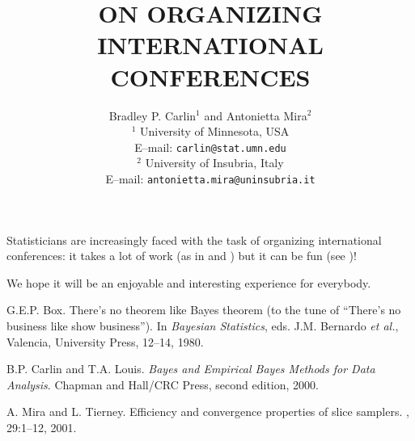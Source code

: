 \documentclass{article}
\begin{document}
\title{ON ORGANIZING INTERNATIONAL CONFERENCES}

\author{Bradley P. Carlin$^1$ and Antonietta Mira$^2$\\
$^1$ University of Minnesota, USA\\
E--mail: \texttt{carlin@stat.umn.edu}\\
$^2$ University of Insubria, Italy\\
E--mail: \texttt{antonietta.mira@uninsubria.it}\\
}


\date{}

\maketitle

%

Statisticians are increasingly faced with the task of organizing
international conferences: it takes a lot of work (as in
\cite{Mira:Tierney:2001} and \cite{Carlin:Louis:2000}) but it can be
fun (see \cite{Box:1980})!

We hope it will be an enjoyable and interesting experience for
everybody.


\begin{thebibliography}{1}

G.E.P. Box. 
\newblock There's no theorem like {B}ayes theorem 
(to the tune of ``{T}here's no business like show business'').
\newblock In {\em Bayesian Statistics}, eds. J.M. Bernardo {\it et
al.}, Valencia, University Press, 12--14, 1980.

 B.P. Carlin and T.A. Louis.  \newblock
{\em {B}ayes and Empirical {B}ayes Methods for Data Analysis}.
\newblock Chapman and Hall/CRC Press, second edition, 2000.

A. Mira and L. Tierney. 
\newblock Efficiency and convergence properties of slice samplers.
, 29:1--12, 2001.

\end{thebibliography}
\end{document}
